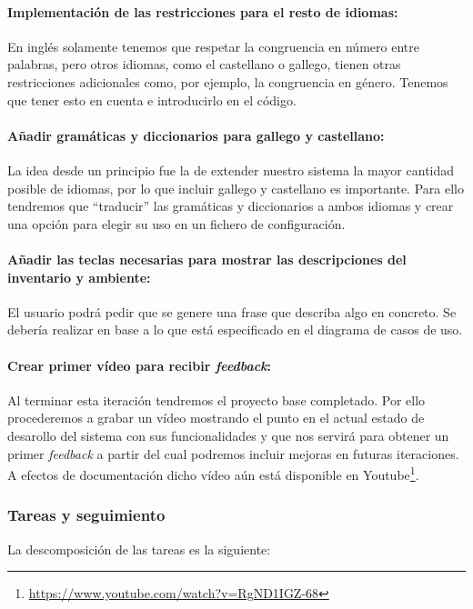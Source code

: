 \paragraph{Implementación de las restricciones para el resto de idiomas:} En inglés solamente tenemos que respetar la congruencia en número entre palabras, pero otros idiomas, como el castellano o gallego, tienen otras restricciones adicionales como, por ejemplo, la congruencia en género. Tenemos que tener esto en cuenta e introducirlo en el código.

\paragraph{Añadir gramáticas y diccionarios para gallego y castellano:} La idea desde un principio fue la de extender nuestro sistema la mayor cantidad posible de idiomas, por lo que incluir gallego y castellano es importante. Para ello tendremos que ``traducir'' las gramáticas y diccionarios a ambos idiomas y crear una opción para elegir su uso en un fichero de configuración.

\paragraph{Añadir las teclas necesarias para mostrar las descripciones del inventario y ambiente:} El usuario podrá pedir que se genere una frase que describa algo en concreto. Se debería realizar en base a lo que está especificado en el diagrama de casos de uso.

\paragraph{Crear primer vídeo para recibir \textit{feedback}:} Al terminar esta iteración tendremos el proyecto base completado. Por ello procederemos a grabar un vídeo mostrando el punto en el actual estado de desarollo del sistema con sus funcionalidades y que nos servirá para obtener un primer \textit{feedback} a partir del cual podremos incluir mejoras en futuras iteraciones. A efectos de documentación dicho vídeo aún está disponible en Youtube\footnote{\url{https://www.youtube.com/watch?v=RgND1IGZ-68}}.

\subsubsection{Tareas y seguimiento}

La descomposición de las tareas es la siguiente:

